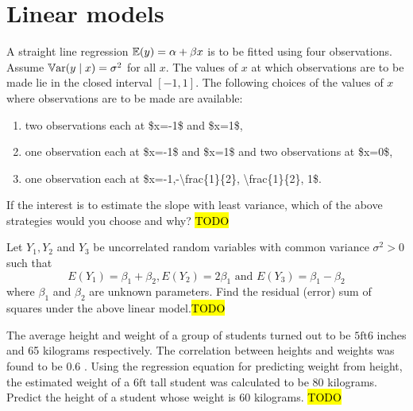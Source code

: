 
\chapter{Linear models \label{chap:linearModels}}
\begin{example}
\label{exa:isi2006samplepsb11}A straight line regression $\mathbb{E}(y)=\alpha+\beta x$
is to be fitted using four observations. Assume $\mathbb{V\mathrm{ar}}(y\mid x)=\sigma^{2}$
for all $x$. The values of $x$ at which observations are to be made
lie in the closed interval $[-1,1]$. The following choices of the
values of $x$ where observations are to be made are available:
\end{example}

\begin{enumerate}
\item two observations each at \$x=-1\$ and \$x=1\$,
\item one observation each at \$x=-1\$ and \$x=1\$ and two observations
at \$x=0\$,
\item one observation each at \$x=-1,-\textbackslash frac\{1\}\{2\}, \textbackslash frac\{1\}\{2\},
1\$.
\end{enumerate}
If the interest is to estimate the slope with least variance, which
of the above strategies would you choose and why? \hl{TODO}
\begin{example}
\label{exa:isi2007samplepsb12}Let $Y_{1},Y_{2}$ and $Y_{3}$ be
uncorrelated random variables with common variance $\sigma^{2}>0$
such that 
\[
E\left(Y_{1}\right)=\beta_{1}+\beta_{2},E\left(Y_{2}\right)=2\beta_{1}\text{ and }E\left(Y_{3}\right)=\beta_{1}-\beta_{2}
\]
 where $\beta_{1}$ and $\beta_{2}$ are unknown parameters. Find
the residual (error) sum of squares under the above linear model.\hl{TODO}
\end{example}

\begin{example}
	\label{exa:isi2009samplepsb9} 
	The average height and weight of a group of students turned out to be $5 \mathrm{ft} 6$ inches and 65 kilograms respectively. The correlation between heights and weights was found to be 0.6 . Using the regression equation for predicting weight from height, the estimated weight of a $6 \mathrm{ft}$ tall student was calculated to be 80 kilograms. Predict the height of a student whose weight is 60 kilograms.
	\hl{TODO}
\end{example}


